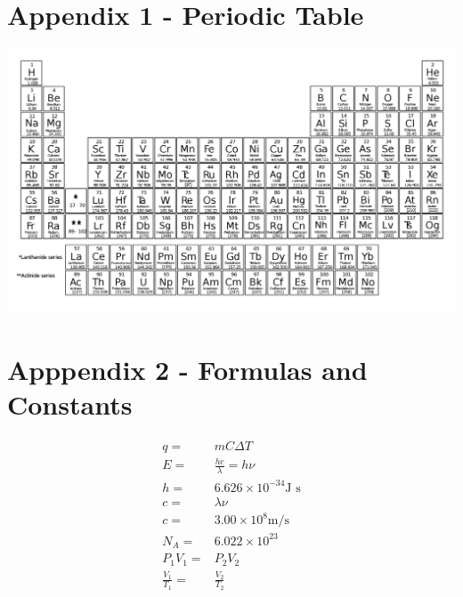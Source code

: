 \documentclass[12pt]{exam}		%
\begin{document}
\newpage

\appendix

\section{Appendix 1 - Periodic Table}

\begin{center}
  \includegraphics[scale=0.24,angle=90]{periodic_table}
\end{center}

\section{Apppendix 2 - Formulas and Constants}

\begin{align*}
  q = & mC\Delta T \\
  E = & \frac{hc}{\lambda} = h\nu \\
  h = & 6.626 \times 10^{-34} \text{J s} \\
  c = & \lambda \nu \\
  c = & 3.00 \times 10^8 \text{m/s} \\
  N_A = & 6.022\times 10^{23} \\
  P_1V_1 = & P_2V_2 \\
  \frac{V_1}{T_1} = & \frac{V_2}{T_2}
\end{align*}
\end{document}

